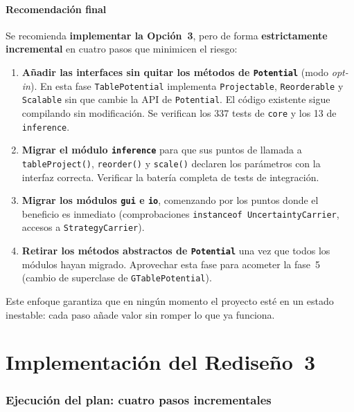 \documentclass[11pt,a4paper]{article}
\newcommand{\code}[1]{\texttt{#1}}
\begin{document}
\subsection{Recomendación final}

Se recomienda \textbf{implementar la Opción~3}, pero de forma
\textbf{estrictamente incremental} en cuatro pasos que minimicen el riesgo:

\begin{enumerate}
  \item \textbf{Añadir las interfaces sin quitar los métodos de \code{Potential}}
        (modo \emph{opt-in}).  En esta fase \code{TablePotential} implementa
        \code{Projectable}, \code{Reorderable} y \code{Scalable} sin que cambie la
        API de \code{Potential}.  El código existente sigue compilando sin
        modificación.  Se verifican los 337 tests de \code{core} y los 13 de
        \code{inference}.

  \item \textbf{Migrar el módulo \code{inference}} para que sus puntos de
        llamada a \code{tableProject()}, \code{reorder()} y \code{scale()}
        declaren los parámetros con la interfaz correcta.  Verificar la
        batería completa de tests de integración.

  \item \textbf{Migrar los módulos \code{gui} e \code{io}}, comenzando por los
        puntos donde el beneficio es inmediato (comprobaciones \code{instanceof
        UncertaintyCarrier}, accesos a \code{StrategyCarrier}).

  \item \textbf{Retirar los métodos abstractos de \code{Potential}} una vez que
        todos los módulos hayan migrado.  Aprovechar esta fase para acometer
        la fase~5 (cambio de superclase de \code{GTablePotential}).
\end{enumerate}

Este enfoque garantiza que en ningún momento el proyecto esté en un estado
inestable: cada paso añade valor sin romper lo que ya funciona.

\part{Implementación del Rediseño~3}
\label{part:rediseno3-impl}

\section{Ejecución del plan: cuatro pasos incrementales}
\label{sec:impl-pasos}
\end{document}

